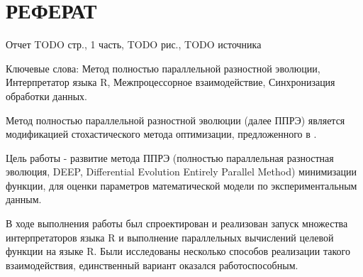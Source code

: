 \chapter*{РЕФЕРАТ}

Отчет TODO стр., 1 часть, TODO рис., TODO источника

Ключевые слова: Метод полностью параллельной разностной эволюции, Интерпретатор языка R, Межпроцессорное взаимодействие, Синхронизация обработки данных.

Метод полностью параллельной разностной эволюции (далее ППРЭ) \cite{Kozlov11, Kozlov13} является модификацией стохастического метода оптимизации, предложенного в \cite{Storn95}.

Цель работы - развитие метода ППРЭ (полностью параллельная разностная эволюция, DEEP, Differential Evolution Entirely Parallel Method) минимизации функции, для оценки параметров математической модели по экспериментальным данным.

В ходе выполнения работы был спроектирован и реализован запуск множества интерпретаторов языка R и выполнение параллельных вычислений целевой функции на языке R. Были исследованы несколько способов реализации такого взаимодействия, единственный вариант оказался работоспособным.
